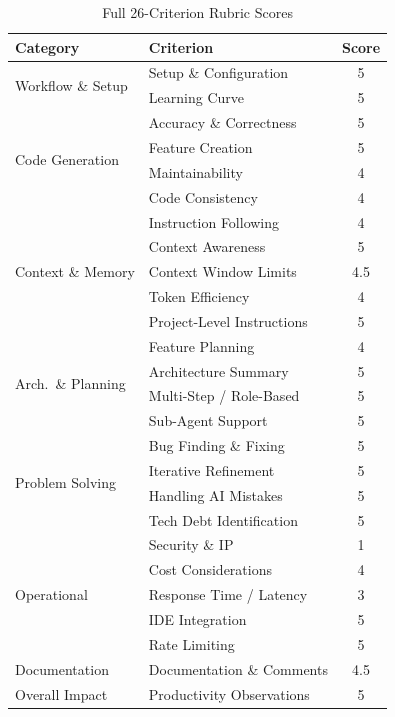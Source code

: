 \documentclass[conference]{IEEEtran}
\begin{document}
\begin{table}[!htbp]
\caption{Full 26-Criterion Rubric Scores}
\label{tab:full_rubric}
\centering
\small
\setlength{\tabcolsep}{3pt}
\begin{tabular}{@{}llc@{}}
\toprule
\textbf{Category} & \textbf{Criterion} & \textbf{Score} \\
\midrule
\multirow{2}{*}{Workflow \& Setup}
 & Setup \& Configuration & 5 \\
 & Learning Curve & 5 \\
\cmidrule(l){2-3}
\multirow{4}{*}{Code Generation}
 & Accuracy \& Correctness & 5 \\
 & Feature Creation & 5 \\
 & Maintainability & 4 \\
 & Code Consistency & 4 \\
\cmidrule(l){2-3}
\multirow{5}{*}{Context \& Memory}
 & Instruction Following & 4 \\
 & Context Awareness & 5 \\
 & Context Window Limits & 4.5 \\
 & Token Efficiency & 4 \\
 & Project-Level Instructions & 5 \\
\cmidrule(l){2-3}
\multirow{4}{*}{Arch.\ \& Planning}
 & Feature Planning & 4 \\
 & Architecture Summary & 5 \\
 & Multi-Step / Role-Based & 5 \\
 & Sub-Agent Support & 5 \\
\cmidrule(l){2-3}
\multirow{4}{*}{Problem Solving}
 & Bug Finding \& Fixing & 5 \\
 & Iterative Refinement & 5 \\
 & Handling AI Mistakes & 5 \\
 & Tech Debt Identification & 5 \\
\cmidrule(l){2-3}
\multirow{5}{*}{Operational}
 & Security \& IP & 1 \\
 & Cost Considerations & 4 \\
 & Response Time / Latency & 3 \\
 & IDE Integration & 5 \\
 & Rate Limiting & 5 \\
\cmidrule(l){2-3}
Documentation & Documentation \& Comments & 4.5 \\
\cmidrule(l){2-3}
Overall Impact & Productivity Observations & 5 \\
\bottomrule
\end{tabular}
\end{table}
\end{document}
